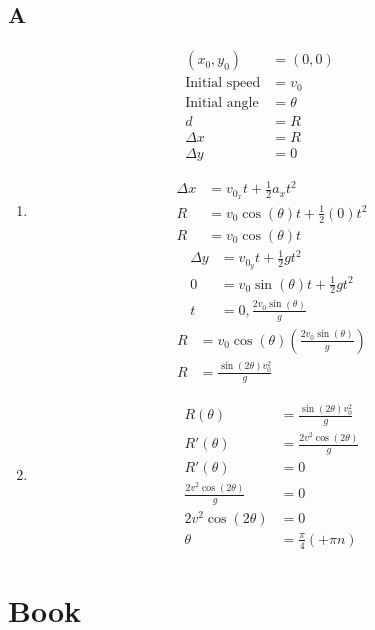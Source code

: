 \documentclass{article}
\begin{document}
\subsection{A}
\begin{align*}
	(x_0, y_0) & = (0, 0) \\
	\text{Initial speed} & = v_0 \\
	\text{Initial angle} & = \theta \\
	d & = R \\
	\Delta x & = R \\
	\Delta y & = 0
\end{align*}
\begin{enumerate}[label=\textbf{\alph*)}]
	\item
		\begin{align*}
			\Delta x & = v_{0_x}t + \frac{1}{2}a_xt^2 \\
			R & = v_0\cos(\theta)t + \frac{1}{2}(0)t^2 \\
			R & = v_0\cos(\theta)t
		\end{align*}
		\begin{align*}
			\Delta y & = v_{0_y}t + \frac{1}{2}gt^2 \\
			0 & = v_0\sin(\theta)t + \frac{1}{2}gt^2 \\
			t & = 0, \frac{2v_0\sin(\theta)}{g}
		\end{align*}
		\begin{align*}
			R & = v_0\cos(\theta) \left( \frac{2v_0\sin(\theta)}{g} \right) \\
			R & = \frac{\sin(2\theta)v_0^2}{g}
		\end{align*}
	\item
		\begin{align*}
			R(\theta) & = \frac{\sin(2\theta)v_0^2}{g} \\
			R'(\theta) & = \frac{2v^2\cos(2\theta)}{g} \\
			R'(\theta) & = 0 \\
			\frac{2v^2\cos(2\theta)}{g} & = 0 \\
			2v^2\cos(2\theta) & = 0 \\
			\theta & = \frac{\pi}{4} (+ \pi n)
		\end{align*}
\end{enumerate}

\section{Book}
\end{document}
